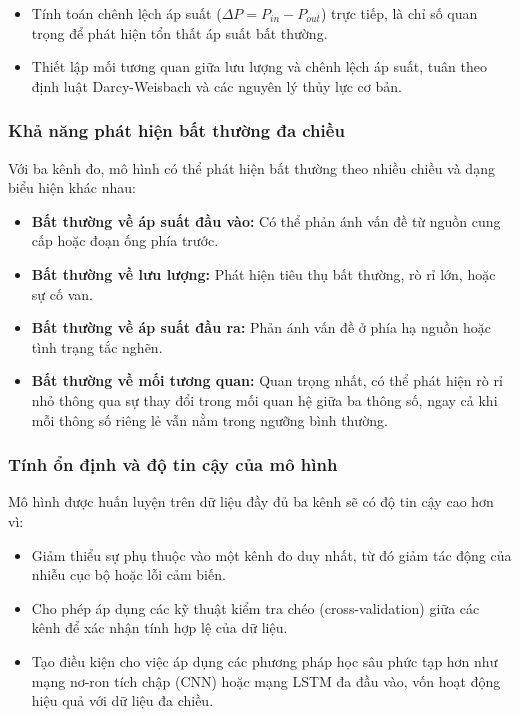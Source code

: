 \begin{itemize}
    \item Tính toán chênh lệch áp suất ($\Delta P = P_{in} - P_{out}$) trực tiếp, là chỉ số quan trọng để phát hiện tổn thất áp suất bất thường.
    \item Thiết lập mối tương quan giữa lưu lượng và chênh lệch áp suất, tuân theo định luật Darcy-Weisbach và các nguyên lý thủy lực cơ bản.
\end{itemize}

\subsubsection{Khả năng phát hiện bất thường đa chiều}
Với ba kênh đo, mô hình có thể phát hiện bất thường theo nhiều chiều và dạng biểu hiện khác nhau:

\begin{itemize}
    \item \textbf{Bất thường về áp suất đầu vào:} Có thể phản ánh vấn đề từ nguồn cung cấp hoặc đoạn ống phía trước.
    \item \textbf{Bất thường về lưu lượng:} Phát hiện tiêu thụ bất thường, rò rỉ lớn, hoặc sự cố van.
    \item \textbf{Bất thường về áp suất đầu ra:} Phản ánh vấn đề ở phía hạ nguồn hoặc tình trạng tắc nghẽn.
    \item \textbf{Bất thường về mối tương quan:} Quan trọng nhất, có thể phát hiện rò rỉ nhỏ thông qua sự thay đổi trong mối quan hệ giữa ba thông số, ngay cả khi mỗi thông số riêng lẻ vẫn nằm trong ngưỡng bình thường.
\end{itemize}

\subsubsection{Tính ổn định và độ tin cậy của mô hình}
Mô hình được huấn luyện trên dữ liệu đầy đủ ba kênh sẽ có độ tin cậy cao hơn vì:

\begin{itemize}
    \item Giảm thiểu sự phụ thuộc vào một kênh đo duy nhất, từ đó giảm tác động của nhiễu cục bộ hoặc lỗi cảm biến.
    \item Cho phép áp dụng các kỹ thuật kiểm tra chéo (cross-validation) giữa các kênh để xác nhận tính hợp lệ của dữ liệu.
    \item Tạo điều kiện cho việc áp dụng các phương pháp học sâu phức tạp hơn như mạng nơ-ron tích chập (CNN) hoặc mạng LSTM đa đầu vào, vốn hoạt động hiệu quả với dữ liệu đa chiều.
\end{itemize}

